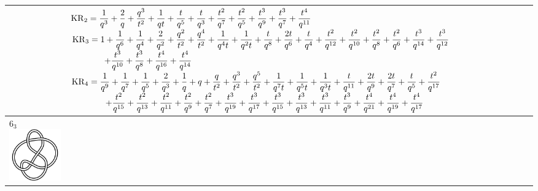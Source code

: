 \documentclass{compositio}
\theoremstyle{definition}
\numberwithin{equation}{section}
\begin{document}
{\begin{longtable}{p{}|p{}}
& 
\newline 
$
\displaystyle{%
\KR_{2} = \frac{1}{q^3}+\frac{2}{q}+\frac{q^3}{t^2}+\frac{1}{q t}+\frac{t}{q^5}+\frac{t}{q^3}+\frac{t^2}{q^7}+\frac{t^2}{q^5}+\frac{t^3}{q^9}+\frac{t^3}{q^7}+\frac{t^4}{q^{11}}
}
$
\newline 
$
\displaystyle{%
\KR_{3} = 1+\frac{1}{q^6}+\frac{1}{q^4}+\frac{2}{q^2}+\frac{q^2}{t^2}+\frac{q^4}{t^2}+\frac{1}{q^4 t}+\frac{1}{q^2 t}+\frac{t}{q^8}+\frac{2 t}{q^6}+\frac{t}{q^4}+\frac{t^2}{q^{12}}+\frac{t^2}{q^{10}}+\frac{t^2}{q^8}+\frac{t^2}{q^6}+\frac{t^3}{q^{14}}+\frac{t^3}{q^{12}}
}
$
\newline
$
\displaystyle{%
\qquad\qquad +\frac{t^3}{q^{10}}+\frac{t^3}{q^8}+\frac{t^4}{q^{16}}+\frac{t^4}{q^{14}}
}
$
\newline 
$
\displaystyle{%
\KR_{4} = \frac{1}{q^9}+\frac{1}{q^7}+\frac{1}{q^5}+\frac{2}{q^3}+\frac{1}{q}+q+\frac{q}{t^2}+\frac{q^3}{t^2}+\frac{q^5}{t^2}+\frac{1}{q^7 t}+\frac{1}{q^5 t}+\frac{1}{q^3 t}+\frac{t}{q^{11}}+\frac{2 t}{q^9}+\frac{2 t}{q^7}+\frac{t}{q^5}+\frac{t^2}{q^{17}}
}
$
\newline
$
\displaystyle{%
\qquad\qquad +\frac{t^2}{q^{15}}+\frac{t^2}{q^{13}}+\frac{t^2}{q^{11}}+\frac{t^2}{q^9}+\frac{t^2}{q^7}+\frac{t^3}{q^{19}}+\frac{t^3}{q^{17}}+\frac{t^3}{q^{15}}+\frac{t^3}{q^{13}}+\frac{t^3}{q^{11}}+\frac{t^3}{q^9}+\frac{t^4}{q^{21}}+\frac{t^4}{q^{19}}+\frac{t^4}{q^{17}}
}
$
\newline 
\\
\hline
$6_{3}$ 
\includegraphics[scale=0.07,angle=0]{knot6_3.pdf} 

\end{longtable}}
\end{document}
